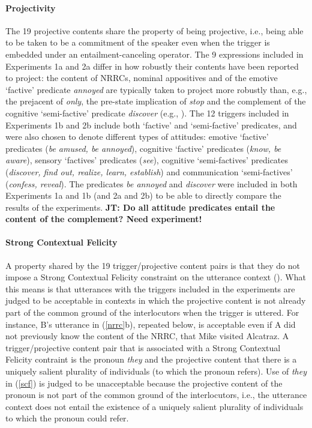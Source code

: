 \documentclass[11pt,fleqn]{article}
\newcommand{\6}{\mbox{$[\hspace*{-.6mm}[$}}
\newcommand{\9}{\mbox{$]\hspace*{-.6mm}]$}}
\newcommand{\jt}[1]{\textbf{\color{blue}JT: #1}}
\begin{document}
\paragraph{Projectivity} The 19 projective contents share the property of being projective, i.e., being able to be taken to be a commitment of the speaker even when the trigger is embedded under an entailment-canceling operator. The 9 expressions included in Experiments 1a and 2a differ in how robustly their contents have been reported to project: 
the content of NRRCs, nominal appositives and of the emotive `factive' predicate {\em annoyed} are typically taken to project more robustly than, e.g., the prejacent of {\em only}, the pre-state implication of {\em stop} and the complement of the cognitive `semi-factive' predicate {\em discover} (e.g., \citealt{karttunen71b,simons01,potts05,abusch10,beaver-belly}). The 12 triggers included in Experiments 1b and 2b include both `factive' and `semi-factive' predicates, and were also chosen to denote different types of attitudes: emotive `factive' predicates ({\em be amused, be annoyed}), cognitive `factive' predicates ({\em know, be aware}), sensory `factives' predicates ({\em see}), cognitive `semi-factives' predicates ({\em discover, find out, realize, learn, establish}) and communication `semi-factives' ({\em confess, reveal}). The predicates {\em be annoyed} and {\em discover} were included in both Experiments 1a and 1b (and 2a and 2b) to be able to directly compare the results of the experiments. \jt{Do all attitude predicates entail the content of the complement? Need  experiment!}

\paragraph{Strong Contextual Felicity} A property shared by the 19 trigger/projective content pairs is that they do not impose a Strong Contextual Felicity constraint on the utterance context (\citealt{brst-lang11}). What this means is that utterances with the triggers included in the experiments are judged to be acceptable in contexts in which the projective content is not already part of the common ground of the interlocutors when the trigger is uttered. For instance, B's utterance in (\ref{nrrc}b), repeated below, is acceptable even if A did not previously know the content of the NRRC, that Mike visited Alcatraz. A trigger/projective content pair that is associated with a Strong Contextual Felicity contraint is the pronoun {\em they} and the projective content that there is a uniquely salient plurality of individuals (to which the pronoun refers). Use of {\em they} in (\ref{scf}) is judged to be unacceptable because the projective content of the pronoun is not part of the common ground of the interlocutors, i.e., the utterance context does not entail the existence of a uniquely salient plurality of individuals to which the pronoun could refer. 
\end{document}
